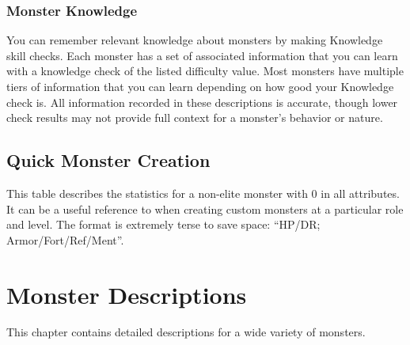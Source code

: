   \subsection{Monster Knowledge}
    You can remember relevant knowledge about monsters by making Knowledge skill checks.
    Each monster has a set of associated information that you can learn with a knowledge check of the listed difficulty value.
    Most monsters have multiple tiers of information that you can learn depending on how good your Knowledge check is.
    All information recorded in these descriptions is accurate, though lower check results may not provide full context for a monster's behavior or nature.

\section{Quick Monster Creation}

  This table describes the statistics for a non-elite monster with 0 in all attributes.
  It can be a useful reference to when creating custom monsters at a particular role and level.
  The format is extremely terse to save space: ``HP/DR; Armor/Fort/Ref/Ment''.

  

  \chapter{Monster Descriptions}

  This chapter contains detailed descriptions for a wide variety of monsters.

  
